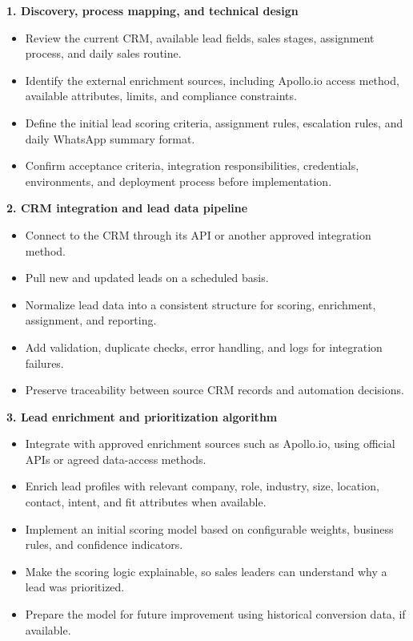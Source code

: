 \documentclass[11pt,a4paper]{article}
\begin{document}
\textbf{1. Discovery, process mapping, and technical design}\par

\begin{itemize}
\item Review the current CRM, available lead fields, sales stages, assignment process, and daily sales routine.
\item Identify the external enrichment sources, including Apollo.io access method, available attributes, limits, and compliance constraints.
\item Define the initial lead scoring criteria, assignment rules, escalation rules, and daily WhatsApp summary format.
\item Confirm acceptance criteria, integration responsibilities, credentials, environments, and deployment process before implementation.
\end{itemize}

\textbf{2. CRM integration and lead data pipeline}\par

\begin{itemize}
\item Connect to the CRM through its API or another approved integration method.
\item Pull new and updated leads on a scheduled basis.
\item Normalize lead data into a consistent structure for scoring, enrichment, assignment, and reporting.
\item Add validation, duplicate checks, error handling, and logs for integration failures.
\item Preserve traceability between source CRM records and automation decisions.
\end{itemize}

\textbf{3. Lead enrichment and prioritization algorithm}\par

\begin{itemize}
\item Integrate with approved enrichment sources such as Apollo.io, using official APIs or agreed data-access methods.
\item Enrich lead profiles with relevant company, role, industry, size, location, contact, intent, and fit attributes when available.
\item Implement an initial scoring model based on configurable weights, business rules, and confidence indicators.
\item Make the scoring logic explainable, so sales leaders can understand why a lead was prioritized.
\item Prepare the model for future improvement using historical conversion data, if available.
\end{itemize}
\end{document}
